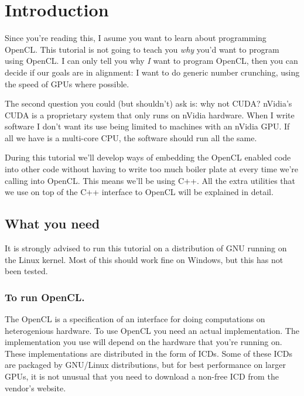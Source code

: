 \documentclass{article}
\begin{document}
  \section{Introduction}
    Since you're reading this, I asume you want to learn about programming \acf{OpenCL}. This tutorial is not going to teach you \emph{why} you'd want to program using \ac{OpenCL}. I can only tell you why \emph{I} want to program \ac{OpenCL}, then you can decide if our goals are in alignment: I want to do generic number crunching, using the speed of \acp{GPU} where possible.

    The second question you could (but shouldn't) ask is: why not \acs{CUDA}? nVidia's \ac{CUDA} is a proprietary system that only runs on nVidia hardware. When I write software I don't want its use being limited to machines with an nVidia \ac{GPU}. If all we have is a multi-core \acs{CPU}, the software should run all the same.

    During this tutorial we'll develop ways of embedding the \ac{OpenCL} enabled code into other code without having to write too much boiler plate at every time we're calling into \ac{OpenCL}. This means we'll be using C++. All the extra utilities that we use on top of the C++ interface to \ac{OpenCL} will be explained in detail.

    \subsection{What you need}
    It is strongly advised to run this tutorial on a distribution of \acs{GNU} running on the Linux kernel. Most of this should work fine on Windows, but this has not been tested.

    \subsubsection{To run \acs{OpenCL}.}
    The \acf{OpenCL} is a specification of an interface for doing computations on heterogenious hardware. To use \ac{OpenCL} you need an actual implementation. The implementation you use will depend on the hardware that you're running on. These implementations are distributed in the form of \acfp{ICD}. Some of these \acp{ICD} are packaged by \acs{GNU}/Linux distributions, but for best performance on larger \acfp{GPU}, it is not unusual that you need to download a non-free \ac{ICD} from the vendor's website.
\end{document}
